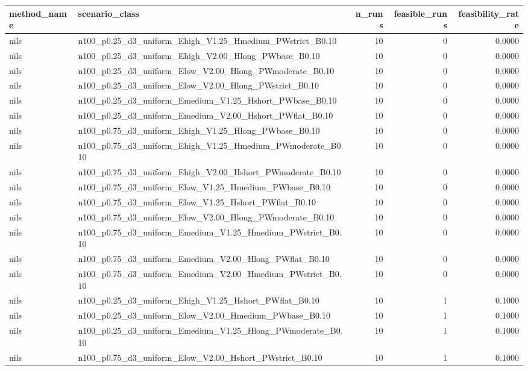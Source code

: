 \begin{tabular}{llrrr}
\toprule
method_name & scenario_class & n_runs & feasible_runs & feasibility_rate \\
\midrule
nils & n100_p0.25_d3_uniform_Ehigh_V1.25_Hmedium_PWstrict_B0.10 & 10 & 0 & 0.0000 \\
nils & n100_p0.25_d3_uniform_Ehigh_V2.00_Hlong_PWbase_B0.10 & 10 & 0 & 0.0000 \\
nils & n100_p0.25_d3_uniform_Elow_V2.00_Hlong_PWmoderate_B0.10 & 10 & 0 & 0.0000 \\
nils & n100_p0.25_d3_uniform_Elow_V2.00_Hlong_PWstrict_B0.10 & 10 & 0 & 0.0000 \\
nils & n100_p0.25_d3_uniform_Emedium_V1.25_Hshort_PWbase_B0.10 & 10 & 0 & 0.0000 \\
nils & n100_p0.25_d3_uniform_Emedium_V2.00_Hshort_PWflat_B0.10 & 10 & 0 & 0.0000 \\
nils & n100_p0.75_d3_uniform_Ehigh_V1.25_Hlong_PWbase_B0.10 & 10 & 0 & 0.0000 \\
nils & n100_p0.75_d3_uniform_Ehigh_V1.25_Hmedium_PWmoderate_B0.10 & 10 & 0 & 0.0000 \\
nils & n100_p0.75_d3_uniform_Ehigh_V2.00_Hshort_PWmoderate_B0.10 & 10 & 0 & 0.0000 \\
nils & n100_p0.75_d3_uniform_Elow_V1.25_Hmedium_PWbase_B0.10 & 10 & 0 & 0.0000 \\
nils & n100_p0.75_d3_uniform_Elow_V1.25_Hshort_PWflat_B0.10 & 10 & 0 & 0.0000 \\
nils & n100_p0.75_d3_uniform_Elow_V2.00_Hlong_PWmoderate_B0.10 & 10 & 0 & 0.0000 \\
nils & n100_p0.75_d3_uniform_Emedium_V1.25_Hmedium_PWstrict_B0.10 & 10 & 0 & 0.0000 \\
nils & n100_p0.75_d3_uniform_Emedium_V2.00_Hlong_PWflat_B0.10 & 10 & 0 & 0.0000 \\
nils & n100_p0.75_d3_uniform_Emedium_V2.00_Hmedium_PWstrict_B0.10 & 10 & 0 & 0.0000 \\
nils & n100_p0.25_d3_uniform_Ehigh_V1.25_Hshort_PWflat_B0.10 & 10 & 1 & 0.1000 \\
nils & n100_p0.25_d3_uniform_Elow_V2.00_Hmedium_PWbase_B0.10 & 10 & 1 & 0.1000 \\
nils & n100_p0.25_d3_uniform_Emedium_V1.25_Hlong_PWmoderate_B0.10 & 10 & 1 & 0.1000 \\
nils & n100_p0.75_d3_uniform_Elow_V2.00_Hshort_PWstrict_B0.10 & 10 & 1 & 0.1000 \\

\end{tabular}
